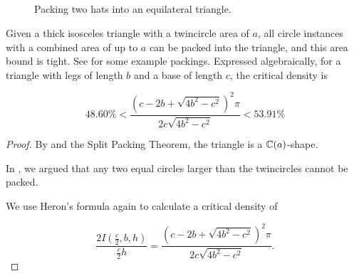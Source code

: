 \documentclass[a4paper,style=print,bibliography=totoc,nexus,lnum,extramargin]{tubsbook}
\begin{document}
\begin{figure}
    ~
    ~

    \vspace{10pt}

    ~
    ~

    \caption{Packing two hats into an equilateral triangle.}
    \label{fig:hats-in-iso}
\end{figure}

\begin{theorem}\label{th:iso}
    Given a thick isosceles triangle with a twincircle area of $a$, all circle instances with a combined area of up to $a$ can be packed into the triangle, and this area bound is tight.
    See  for some example packings.
    Expressed algebraically, for a triangle with legs of length $b$ and a base of length $c$, the critical density is

    $$48.60\% < \frac{(c-2b+\sqrt{4b^2-c^2})^2\pi}{2c\sqrt{4b^2-c^2}} < 53.91\%$$
\end{theorem}

\begin{proof}
    By  and the Split Packing Theorem, the triangle is a $\mathbb{C}(a)$-shape.

    In , we argued that any two equal circles larger than the twincircles cannot be packed.

    We use Heron's formula again to calculate a critical density of

    $$\frac{2I(\frac{c}{2}, b, h)}{\frac{c}{2}h} = \frac{(c-2b+\sqrt{4b^2-c^2})^2\pi}{2c\sqrt{4b^2-c^2}}.$$
\end{proof}
\end{document}
